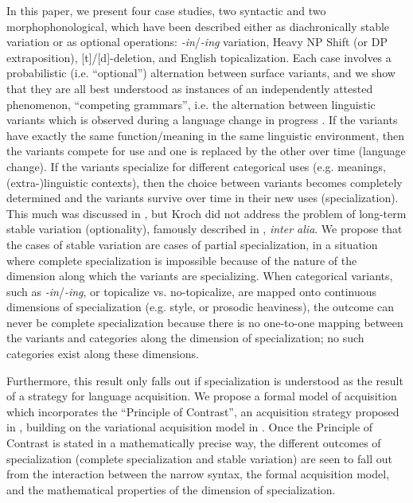 \documentclass[a4paper,aps,prl,12pt,tightenlines,superscriptaddress]{revtex4}
\begin{document}
In this paper, we present four case studies, two syntactic and two morphophonological, which have been described either as diachronically stable variation or as optional operations: \textsl{-in}/\textsl{-ing} variation, Heavy NP Shift (or DP extraposition), [t]/[d]-deletion, and English topicalization.
Each case involves a probabilistic (i.e. ``optional'') alternation between surface variants, and we show that they are all best understood as instances of an independently attested phenomenon, ``competing grammars'', i.e. the alternation between linguistic variants which is observed during a language change in progress \citep[][]{kroch1989}.
If the variants have exactly the same function/meaning in the same linguistic environment, then the variants compete for use and one is replaced by the other over time (language change). 
If the variants specialize for different categorical uses (e.g. meanings, (extra-)linguistic  contexts), then the choice between variants becomes completely determined and the variants survive over time in their new uses (specialization). 
This much was discussed in \citet{kroch1994}, but Kroch did not address the problem of long-term stable variation (optionality), famously described in \citet{labov1989}, \textsl{inter alia}. 
We propose that the cases of stable variation are cases of partial specialization, in a situation where complete specialization is impossible because of the nature of the dimension along which the variants are specializing.
When categorical variants, such as \textsl{-in}/\textsl{-ing}, or topicalize vs. no-topicalize, are mapped onto continuous dimensions of specialization (e.g. style, or prosodic heaviness), the outcome can never be complete specialization because there is no one-to-one mapping between the variants and categories along the dimension of specialization; no such categories exist along these dimensions.
 
Furthermore, this result only falls out if specialization is understood as the result of a strategy for language acquisition. 
We propose a formal model of acquisition which incorporates the ``Principle of Contrast'', an acquisition strategy proposed in \citet{clark1987, clark1990}, building on the variational acquisition model in \citet{yang2000}.
Once the Principle of Contrast is stated in a mathematically precise way, the different outcomes of specialization (complete specialization and stable variation) are seen to fall out from the interaction between the narrow syntax, the formal acquisition model, and the mathematical properties of the dimension of specialization.



\end{document}
